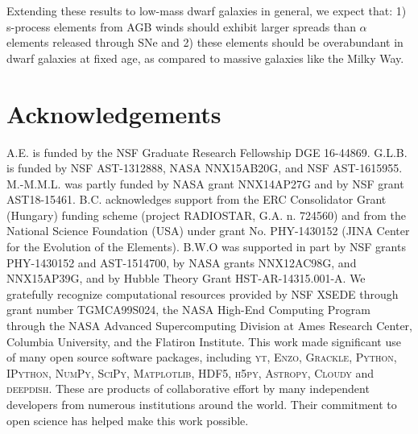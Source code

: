     Extending these results to low-mass dwarf galaxies in general, we expect that: 1) s-process elements from AGB winds should exhibit larger spreads than $\alpha$ elements released through SNe and 2) these elements should be overabundant in dwarf galaxies at fixed age, as compared to massive galaxies like the Milky Way.

\section*{Acknowledgements}
A.E. is funded by the NSF Graduate Research Fellowship DGE 16-44869. G.L.B. is funded by NSF AST-1312888, NASA NNX15AB20G, and NSF AST-1615955. M.-M.M.L. was partly funded by NASA  grant NNX14AP27G and by NSF grant AST18-15461. B.C. acknowledges support from the ERC Consolidator Grant (Hungary) funding scheme (project RADIOSTAR, G.A. n. 724560) and from the National Science Foundation (USA) under grant No. PHY-1430152 (JINA Center for the Evolution of the Elements). B.W.O was supported in part by NSF grants PHY-1430152 and AST-1514700, by NASA grants NNX12AC98G, and NNX15AP39G, and by Hubble Theory Grant HST-AR-14315.001-A. We gratefully recognize computational resources provided by NSF XSEDE through grant number TGMCA99S024, the NASA High-End Computing Program through the NASA Advanced Supercomputing Division at Ames Research Center, Columbia University, and the Flatiron Institute. This work made significant use of many open source software packages, including \textsc{yt}, \textsc{Enzo}, \textsc{Grackle}, \textsc{Python}, \textsc{IPython}, \textsc{NumPy}, \textsc{SciPy}, \textsc{Matplotlib}, \textsc{HDF5}, \textsc{h5py}, \textsc{Astropy}, \textsc{Cloudy} and \textsc{deepdish}. These are products of collaborative effort by many independent developers from numerous institutions around the world. Their commitment to open science has helped make this work possible.

